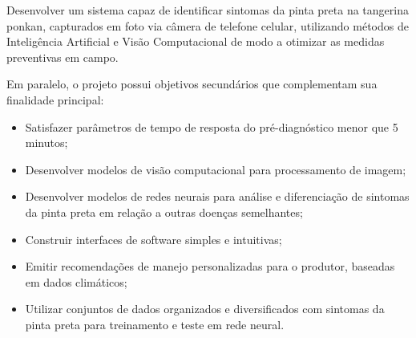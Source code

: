 Desenvolver um sistema capaz de identificar sintomas da pinta preta na tangerina ponkan, capturados em foto via câmera de telefone celular, utilizando métodos de Inteligência Artificial e Visão Computacional de modo a otimizar as medidas preventivas em campo. 

Em paralelo, o projeto possui objetivos secundários que complementam sua finalidade principal:\\


\begin{itemize}
    \item Satisfazer parâmetros de tempo de resposta do pré-diagnóstico menor que 5 minutos;
    \item Desenvolver modelos de visão computacional para processamento de imagem;
    \item Desenvolver modelos de redes neurais para análise e diferenciação de sintomas da pinta preta em relação a outras doenças semelhantes;
    \item Construir interfaces de software simples e intuitivas;
    \item Emitir recomendações de manejo personalizadas para o produtor, baseadas em dados climáticos; 
    \item Utilizar conjuntos de dados organizados e diversificados com sintomas da pinta preta para treinamento e teste em rede neural.
\end{itemize}
